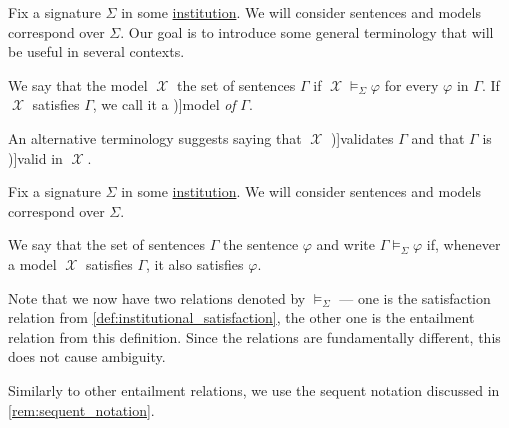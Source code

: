\begin{definition}\label{def:institutional_satisfaction}
  Fix a signature \( \Sigma \) in some \hyperref[def:institution]{institution}. We will consider sentences and models correspond over \( \Sigma \). Our goal is to introduce some general terminology that will be useful in several contexts.

  We say that the model \( \mscrX \)  the set of sentences \( \Gamma \) if \( \mscrX \vDash_\Sigma \varphi \) for every \( \varphi \) in \( \Gamma \). If \( \mscrX \) satisfies \( \Gamma \), we call it a \term[ru=модель (теории первого порядка) (\cite[def. 2.6.21]{Герасимов2014Вычислимость})]{model} \emph{of} \( \Gamma \).

  An alternative terminology suggests saying that \( \mscrX \) \term[en=(first-order structure) validates (\cite[39]{CitkinMuravitsky2022ConsequenceRelations})]{validates} \( \Gamma \) and that \( \Gamma \) is \term[en=valid (in general model) (\cite[239]{Andrews2002Logic})]{valid} in \( \mscrX \).
\end{definition}

\begin{definition}\label{def:institutional_entailment}
  Fix a signature \( \Sigma \) in some \hyperref[def:institution]{institution}. We will consider sentences and models correspond over \( \Sigma \).

  We say that the set of sentences \( \Gamma \)  the sentence \( \varphi \) and write \( \Gamma \vDash_\Sigma \varphi \) if, whenever a model \( \mscrX \) satisfies \( \Gamma \), it also satisfies \( \varphi \).
\end{definition}
\begin{comments}
  \item Note that we now have two relations denoted by \( \vDash_\Sigma \) --- one is the satisfaction relation from \cref{def:institutional_satisfaction}, the other one is the entailment relation from this definition. Since the relations are fundamentally different, this does not cause ambiguity.

  \item Similarly to other entailment relations, we use the sequent notation discussed in \cref{rem:sequent_notation}.
\end{comments}

